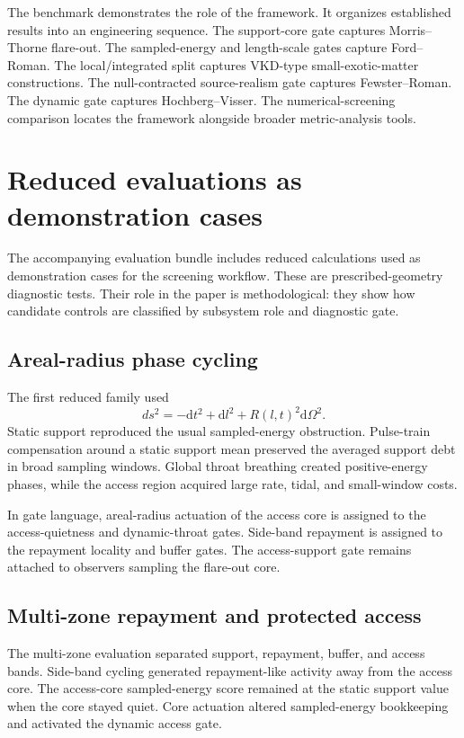 \documentclass[11pt]{article}
\newcommand{\dd}{\mathrm{d}}
\begin{document}
The benchmark demonstrates the role of the framework.  It organizes established results into an engineering sequence.  The support-core gate captures Morris--Thorne flare-out.  The sampled-energy and length-scale gates capture Ford--Roman.  The local/integrated split captures VKD-type small-exotic-matter constructions.  The null-contracted source-realism gate captures Fewster--Roman.  The dynamic gate captures Hochberg--Visser.  The numerical-screening comparison locates the framework alongside broader metric-analysis tools.

\section{Reduced evaluations as demonstration cases}
\label{sec:reduced}

The accompanying evaluation bundle includes reduced calculations used as demonstration cases for the screening workflow.  These are prescribed-geometry diagnostic tests.  Their role in the paper is methodological: they show how candidate controls are classified by subsystem role and diagnostic gate.

\subsection{Areal-radius phase cycling}

The first reduced family used
\begin{equation}
 ds^2=-\dd t^2+\dd l^2+R(l,t)^2\dd\Omega^2.
\end{equation}
Static support reproduced the usual sampled-energy obstruction.  Pulse-train compensation around a static support mean preserved the averaged support debt in broad sampling windows.  Global throat breathing created positive-energy phases, while the access region acquired large rate, tidal, and small-window costs.

In gate language, areal-radius actuation of the access core is assigned to the access-quietness and dynamic-throat gates.  Side-band repayment is assigned to the repayment locality and buffer gates.  The access-support gate remains attached to observers sampling the flare-out core.

\subsection{Multi-zone repayment and protected access}

The multi-zone evaluation separated support, repayment, buffer, and access bands.  Side-band cycling generated repayment-like activity away from the access core.  The access-core sampled-energy score remained at the static support value when the core stayed quiet.  Core actuation altered sampled-energy bookkeeping and activated the dynamic access gate.
\end{document}

